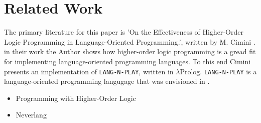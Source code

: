 
\section{Related Work}

The primary literature for this paper is 'On the Effectiveness of Higher-Order Logic Programming in Language-Oriented Programming.', written by M. Cimini \cite{cimini_effectiveness_2020}. in their work the Author shows how higher-order logic programming is a gread fit for implementing language-oriented programming languages. To this end Cimini presents an implementation of \texttt{LANG-N-PLAY}, written in $\lambda$Prolog. \texttt{LANG-N-PLAY} is a language-oriented programming langugage that was envisioned in \cite{cimini_languages_2018}.

\begin{itemize}
  \item Programming with Higher-Order Logic\cite{miller_programming_2012}
  \item Neverlang\cite{vacchi_neverlang_2015}
\end{itemize}